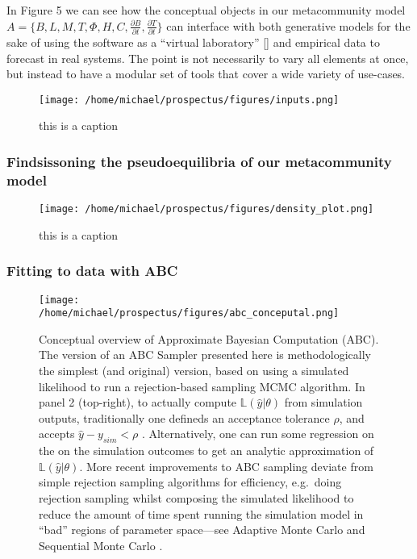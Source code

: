 \documentclass[]{article}
\begin{document}
In Figure 5 we can see how the conceptual objects in our metacommunity
model
\(A = \{B, L, M, T, \Phi, H, C, \frac{\partial B}{\partial t}, \frac{\partial T}{\partial t} \}\)
can interface with both generative models for the sake of using the
software as a ``virtual laboratory'' {[}\citep{volker_grimm}{]} and
empirical data to forecast in real systems. The point is not necessarily
to vary all elements at once, but instead to have a modular set of tools
that cover a wide variety of use-cases.

\begin{figure}[H]
\centering
\texttt{[image: /home/michael/prospectus/figures/inputs.png]}
\caption{this is a caption}
\end{figure}



\hypertarget{finding-the-pseudoequilibria-of-our-metacommunity-model}{%
\subsubsection{Findsissoning the pseudoequilibria of our metacommunity
model}\label{finding-the-pseudoequilibria-of-our-metacommunity-model}}

\begin{figure}[H]
\centering
\texttt{[image: /home/michael/prospectus/figures/density\_plot.png]}
\caption{this is a caption}
\end{figure}

\hypertarget{fitting-to-data-with-abc}{%
\subsubsection{Fitting to data with
ABC}\label{fitting-to-data-with-abc}}

\begin{figure}[H]
\centering
\texttt{[image: /home/michael/prospectus/figures/abc\_conceputal.png]}
\caption{Conceptual overview of Approximate Bayesian Computation (ABC).
The version of an ABC Sampler presented here is methodologically the
simplest (and original) version, based on using a simulated likelihood
to run a rejection-based sampling MCMC algorithm. In panel 2
(top-right), to actually compute \(\mathbb{L}(\hat{y} | \theta)\) from
simulation outputs, traditionally one defineds an acceptance tolerance
\(\rho\), and accepts \(\hat{y} - y_{sim} < \rho\) . Alternatively, one
can run some regression on the on the simulation outcomes to get an
analytic approximation of \(\mathbb{L}(\hat{y} | \theta)\). More recent
improvements to ABC sampling deviate from simple rejection sampling
algorithms for efficiency, e.g.~doing rejection sampling whilst
composing the simulated likelihood to reduce the amount of time spent
running the simulation model in ``bad'' regions of parameter space---see
Adaptive Monte Carlo \citep{beaumont_adaptive_2009} and Sequential
Monte Carlo \citep{cite}.}
\end{figure}
\end{document}
